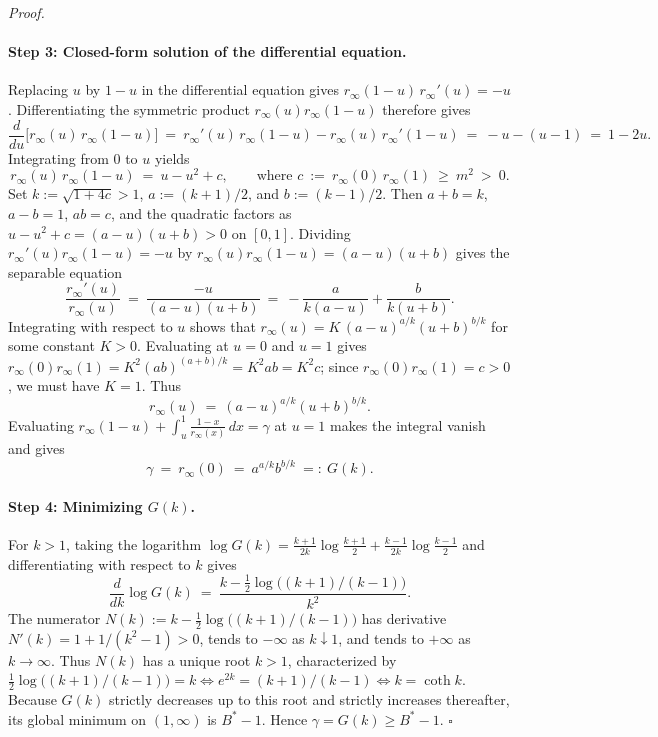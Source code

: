 \documentclass[11pt,letterpaper]{article}
\newenvironment{proof}[1][Proof]{\par\smallskip\noindent\textit{#1.}\ \ignorespaces}{\hfill$\square$\par\medskip}
\begin{document}
\begin{proof}
\paragraph{Step 3: Closed-form solution of the differential equation.}
Replacing $u$ by $1-u$ in the differential equation gives $r_\infty(1-u)\,r_\infty'(u) = -u$. Differentiating the symmetric product $r_\infty(u)r_\infty(1-u)$ therefore gives
\[
  \frac{d}{du}\bigl[r_\infty(u)\,r_\infty(1-u)\bigr]
  \ =\ r_\infty'(u)\,r_\infty(1-u) - r_\infty(u)\,r_\infty'(1-u)
  \ =\ -u - (u-1)\ =\ 1 - 2u .
\]
Integrating from $0$ to $u$ yields
\[
  r_\infty(u)\,r_\infty(1-u)\ =\ u - u^2 + c,\qquad\text{where } c\ :=\ r_\infty(0)\,r_\infty(1)\ \ge\ m^2\ >\ 0.
\]
Set $k := \sqrt{1+4c} > 1$, $a := (k+1)/2$, and $b := (k-1)/2$. Then $a+b=k$, $a-b=1$, $ab=c$, and the quadratic factors as $u-u^2+c = (a-u)(u+b) > 0$ on $[0,1]$. Dividing $r_\infty'(u)r_\infty(1-u) = -u$ by $r_\infty(u)r_\infty(1-u) = (a-u)(u+b)$ gives the separable equation
\[
  \frac{r_\infty'(u)}{r_\infty(u)}
  \ =\ \frac{-u}{(a-u)(u+b)}
  \ =\ -\frac{a}{k(a-u)} + \frac{b}{k(u+b)} .
\]
Integrating with respect to $u$ shows that $r_\infty(u) = K\,(a-u)^{a/k}(u+b)^{b/k}$ for some constant $K>0$. Evaluating at $u=0$ and $u=1$ gives $r_\infty(0)r_\infty(1) = K^2(ab)^{(a+b)/k} = K^2 ab = K^2 c$; since $r_\infty(0)r_\infty(1)=c>0$, we must have $K=1$. Thus
\[
  r_\infty(u)\ =\ (a-u)^{a/k}(u+b)^{b/k} .
\]
Evaluating $r_\infty(1-u) + \int_u^1 \frac{1-x}{r_\infty(x)}\,dx = \gamma$ at $u=1$ makes the integral vanish and gives
\[
  \gamma\ =\ r_\infty(0)\ =\ a^{a/k}b^{b/k}\ =:\ G(k).
\]

\paragraph{Step 4: Minimizing $G(k)$.}
For $k>1$, taking the logarithm $\log G(k) = \frac{k+1}{2k}\log\frac{k+1}{2} + \frac{k-1}{2k}\log\frac{k-1}{2}$ and differentiating with respect to $k$ gives
\[
  \frac{d}{dk}\log G(k)\ =\ \frac{k - \frac12\log\bigl((k+1)/(k-1)\bigr)}{k^2} .
\]
The numerator $N(k) := k - \frac12\log\bigl((k+1)/(k-1)\bigr)$ has derivative $N'(k) = 1 + 1/(k^2-1) > 0$, tends to $-\infty$ as $k\downarrow 1$, and tends to $+\infty$ as $k\to\infty$. Thus $N(k)$ has a unique root $k>1$, characterized by $\frac12\log\bigl((k+1)/(k-1)\bigr) = k \iff e^{2k} = (k+1)/(k-1) \iff k = \coth k$. Because $G(k)$ strictly decreases up to this root and strictly increases thereafter, its global minimum on $(1,\infty)$ is $B^*-1$. Hence $\gamma = G(k) \ge B^*-1$.
\end{proof}
\end{document}
